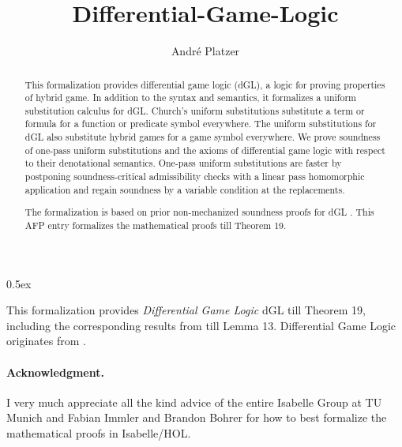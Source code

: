 \documentclass[11pt,a4paper]{article}
\begin{document}
\title{Differential-Game-Logic}
\author{Andr\'e Platzer}
\maketitle

\begin{abstract}
This formalization provides differential game logic (\textsf{dGL}), a logic for proving properties of hybrid game. In addition to the syntax and semantics, it formalizes a uniform substitution calculus for \textsf{dGL}. Church's uniform substitutions substitute a term or formula for a function or predicate symbol everywhere. The uniform substitutions for \textsf{dGL} also substitute hybrid games for a game symbol everywhere. We prove soundness of one-pass uniform substitutions and the axioms of differential game logic with respect to their denotational semantics. One-pass uniform substitutions are faster by postponing soundness-critical admissibility checks with a linear pass homomorphic application and regain soundness by a variable condition at the replacements.

The formalization is based on prior non-mechanized soundness proofs for \textsf{dGL} \cite{DBLP:journals/tocl/Platzer15,DBLP:conf/cade/Platzer18,DBLP:conf/cade/Platzer19,DBLP:journals/tocl/Platzer15,DBLP:journals/corr/Platzer18:usubst}. This AFP entry formalizes the mathematical proofs \cite{DBLP:conf/cade/Platzer19,DBLP:journals/corr/abs-1902-07230} till Theorem 19.
\end{abstract}

\tableofcontents
\newpage

\parindent 0pt\parskip 0.5ex

This formalization provides \emph{Differential Game Logic} \textsf{dGL} \cite{DBLP:journals/corr/abs-1902-07230,DBLP:conf/cade/Platzer19} till Theorem 19,
including the corresponding results from  \cite{DBLP:conf/cade/Platzer18} till Lemma 13.
Differential Game Logic originates from \cite{DBLP:journals/tocl/Platzer15}.\\[1em]




\paragraph{Acknowledgment.}
I very much appreciate all the kind advice of the entire Isabelle Group at TU Munich and Fabian Immler and Brandon Bohrer for how to best formalize the mathematical proofs in Isabelle/HOL.



\end{document}
